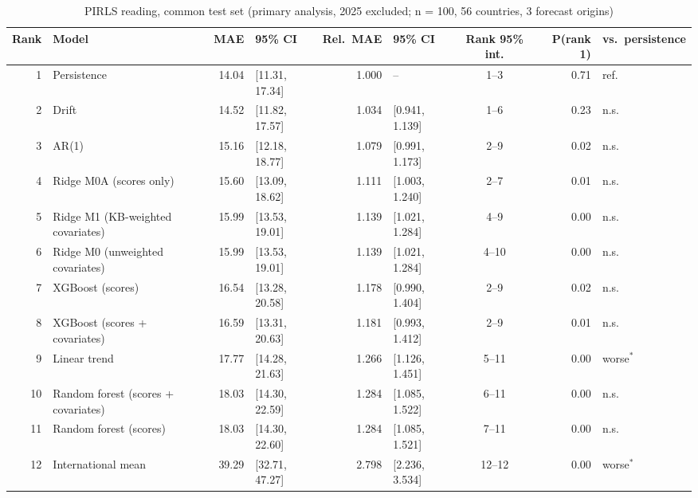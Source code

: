 \begin{table}[htbp]
\centering
\footnotesize
\caption{PIRLS reading, common test set (primary analysis, 2025 excluded; n = 100, 56 countries, 3 forecast origins)}
\label{tab:A9}
\begin{tabular}{rlrlrlcrl}
\toprule
Rank & Model & MAE & 95\% CI & Rel.\ MAE & 95\% CI & Rank 95\% int. & P(rank 1) & vs.\ persistence \\
\midrule
1 & Persistence & 14.04 & [11.31, 17.34] & 1.000 & -- & 1--3 & 0.71 & ref. \\
2 & Drift & 14.52 & [11.82, 17.57] & 1.034 & [0.941, 1.139] & 1--6 & 0.23 & n.s. \\
3 & AR(1) & 15.16 & [12.18, 18.77] & 1.079 & [0.991, 1.173] & 2--9 & 0.02 & n.s. \\
4 & Ridge M0A (scores only) & 15.60 & [13.09, 18.62] & 1.111 & [1.003, 1.240] & 2--7 & 0.01 & n.s. \\
5 & Ridge M1 (KB-weighted covariates) & 15.99 & [13.53, 19.01] & 1.139 & [1.021, 1.284] & 4--9 & 0.00 & n.s. \\
6 & Ridge M0 (unweighted covariates) & 15.99 & [13.53, 19.01] & 1.139 & [1.021, 1.284] & 4--10 & 0.00 & n.s. \\
7 & XGBoost (scores) & 16.54 & [13.28, 20.58] & 1.178 & [0.990, 1.404] & 2--9 & 0.02 & n.s. \\
8 & XGBoost (scores + covariates) & 16.59 & [13.31, 20.63] & 1.181 & [0.993, 1.412] & 2--9 & 0.01 & n.s. \\
9 & Linear trend & 17.77 & [14.28, 21.63] & 1.266 & [1.126, 1.451] & 5--11 & 0.00 & worse$^{*}$ \\
10 & Random forest (scores + covariates) & 18.03 & [14.30, 22.59] & 1.284 & [1.085, 1.522] & 6--11 & 0.00 & n.s. \\
11 & Random forest (scores) & 18.03 & [14.30, 22.60] & 1.284 & [1.085, 1.521] & 7--11 & 0.00 & n.s. \\
12 & International mean & 39.29 & [32.71, 47.27] & 2.798 & [2.236, 3.534] & 12--12 & 0.00 & worse$^{*}$ \\
\bottomrule
\end{tabular}
\par{}
\end{table}

